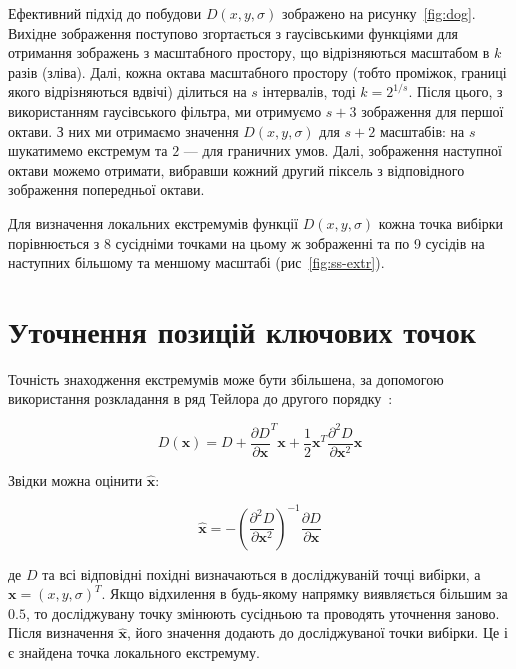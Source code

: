 Ефективний підхід до побудови $D(x,y,\sigma)$ зображено на рисунку~\ref{fig:dog}. Вихідне зображення поступово згортається з гаусівськими функціями для отримання зображень з масштабного простору, що відрізняються масштабом в $k$ разів (зліва). Далі, кожна октава масштабного простору (тобто проміжок, границі якого відрізняються вдвічі) ділиться на $s$ інтервалів, тоді $k = 2^{1/s}$. Після цього, з використанням гаусівського фільтра, ми отримуємо $s+3$ зображення для першої октави. З них ми отримаємо значення $D(x,y,\sigma)$ для $s+2$ масштабів: на $s$ шукатимемо екстремум та $2$ --- для граничних умов. Далі, зображення наступної октави можемо отримати, вибравши кожний другий піксель з відповідного зображення попередньої октави.


Для визначення локальних екстремумів функції $D(x,y,\sigma)$ кожна точка вибірки порівнюється з 8 сусідніми точками на цьому ж зображенні та по 9 сусідів на наступних більшому та меншому масштабі (рис~\ref{fig:ss-extr}).

\section{Уточнення позицій ключових точок}

Точність знаходження екстремумів може бути збільшена, за допомогою використання розкладання в ряд Тейлора до другого порядку~\cite{Brown02invariantfeatures}:

\begin{equation}
  \label{eq:d-taylor}
  D(\mathbf{x}) = D + {\frac{\partial D}{\partial \mathbf{x}}}^T \mathbf{x} + \frac12 \mathbf{x}^T \frac{\partial ^2 D}{\partial\mathbf{x}^2}\mathbf{x}
\end{equation}

Звідки можна оцінити $\hat{\mathbf{x}}$:

\begin{equation}
  \label{eq:extr-est}
  \hat{\mathbf{x}} = -\left(\frac{\partial^2 D}{\partial \mathbf{x}^2}\right)^{-1} \frac{\partial D}{\partial \mathbf{x}}
\end{equation}

де $D$ та всі відповідні похідні визначаються в досліджуваній точці вибірки, а $\mathbf{x} = (x,y,\sigma)^T$. Якщо відхилення в будь-якому напрямку виявляється більшим за $0.5$, то досліджувану точку змінюють сусідньою та проводять уточнення заново. Після визначення $\hat{\mathbf{x}}$, його значення додають до досліджуваної точки вибірки. Це і є знайдена точка локального екстремуму. 

